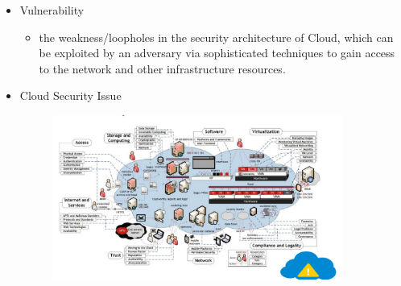 \documentclass{article}
\begin{document}
\begin{itemize}
    \item Vulnerability 
    \begin{itemize}
        \item the weakness/loopholes in the security architecture of Cloud, which can be exploited by an adversary via sophisticated techniques to gain access to the network and other infrastructure resources.
    \end{itemize}
    \item Cloud Security Issue
    \begin{figure}[h]
        \centering
        \includegraphics[width=0.90\textwidth]{figure/cloud_security_issue.png}

\end{figure}
\end{itemize}
\end{document}
